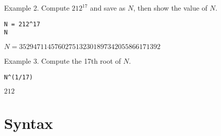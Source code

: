 \documentclass[12pt]{article}
\begin{document}
\bigskip
Example 2. Compute $212^{17}$ and save as $N$,
then show the value of $N$.

{\color{blue}
\begin{verbatim}
N = 212^17
N
\end{verbatim}}

$N=3529471145760275132301897342055866171392$

\bigskip
Example 3. Compute the 17th root of $N$.

{\color{blue}
\begin{verbatim}
N^(1/17)
\end{verbatim}}

$212$

\iffalse
\bigskip
Note: The above examples were inspired by the following passage from
Vladimir Nabokov's autobiography ``Speak, Memory.''

\begin{quote}
A foolish tutor had explained logarithms to me much too early, and I had
read (in a British publication, the {\it Boy's Own Paper}, I believe)
about a certain Hindu calculator who in exactly two seconds could find the
seventeenth root of, say,
3529471145760275132301897342055866171392
(I am not sure I have got this right; anyway the root was 212).
\end{quote}
\fi

\newpage

\section{Syntax}
\end{document}

